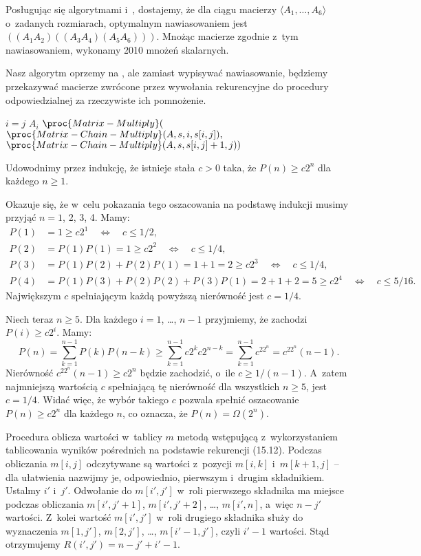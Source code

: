 
\exercise %
Posługując się algorytmami  i~, dostajemy, że dla ciągu macierzy $\langle A_1,\dots,A_6\rangle$ o~zadanych rozmiarach, optymalnym nawiasowaniem jest $((A_1A_2)((A_3A_4)(A_5A_6)))$.
Mnożąc macierze zgodnie z~tym nawiasowaniem, wykonamy 2010 mnożeń skalarnych.

\exercise %
Nasz algorytm oprzemy na , ale zamiast wypisywać nawiasowanie, będziemy przekazywać macierze zwrócone przez wywołania rekurencyjne do procedury odpowiedzialnej za rzeczywiste ich pomnożenie.
\begin{codebox}
\li	\If $i=j$
\li		\Then \Return $A_i$
		\End
\li	\Return $\proc{Matrix-Multiply}($
\zi	\>\>\> $\proc{Matrix-Chain-Multiply}(A,s,i,s[i,j]),$
\zi	\>\>\> $\proc{Matrix-Chain-Multiply}(A,s,s[i,j]+1,j))$
\end{codebox}

\exercise %
Udowodnimy przez indukcję, że istnieje stała $c>0$ taka, że $P(n)\ge c2^n$ dla każdego $n\ge1$.

Okazuje się, że w~celu pokazania tego oszacowania na podstawę indukcji musimy przyjąć $n=1$, 2, 3, 4.
Mamy:
\begin{align*}
	P(1) &= 1 \ge c2^1 \quad\Leftrightarrow\quad c \le 1/2, \\
	P(2) &= P(1)P(1) = 1 \ge c2^2 \quad\Leftrightarrow\quad c \le 1/4, \\
	P(3) &= P(1)P(2)+P(2)P(1) = 1+1 = 2 \ge c2^3 \quad\Leftrightarrow\quad c \le 1/4, \\
	P(4) &= P(1)P(3)+P(2)P(2)+P(3)P(1) = 2+1+2 = 5 \ge c2^4 \quad\Leftrightarrow\quad c \le 5/16.
\end{align*}
Największym $c$ spełniającym każdą powyższą nierówność jest $c=1/4$.

Niech teraz $n\ge5$.
Dla każdego $i=1$, \dots, $n-1$ przyjmiemy, że zachodzi $P(i)\ge c2^i$.
Mamy:
\[
	P(n) = \sum_{k=1}^{n-1}P(k)P(n-k) \ge \sum_{k=1}^{n-1}c2^kc2^{n-k} = \sum_{k=1}^{n-1}c^22^n = c^22^n(n-1).
\]
Nierówność $c^22^n(n-1)\ge c2^n$ będzie zachodzić, o~ile $c\ge1/(n-1)$.
A~zatem najmniejszą wartością $c$ spełniającą tę nierówność dla wszystkich $n\ge5$, jest $c=1/4$.
Widać więc, że wybór takiego $c$ pozwala spełnić oszacowanie $P(n)\ge c2^n$ dla każdego $n$, co oznacza, że $P(n)=\Omega(2^n)$.

\exercise %
Procedura  oblicza wartości w~tablicy $m$ metodą wstępującą z~wykorzystaniem tablicowania wyników pośrednich na podstawie rekurencji (15.12).
Podczas obliczania $m[i,j]$ odczytywane są wartości z~pozycji $m[i,k]$ i~$m[k+1,j]$ -- dla ułatwienia nazwijmy je, odpowiednio, pierwszym i~drugim składnikiem.
Ustalmy $i'$ i~$j'$.
Odwołanie do $m[i',j']$ w~roli pierwszego składnika ma miejsce podczas obliczania $m[i',j'+1]$, $m[i',j'+2]$, \dots, $m[i',n]$, a~więc $n-j'$ wartości.
Z~kolei wartość $m[i',j']$ w~roli drugiego składnika służy do wyznaczenia $m[1,j']$, $m[2,j']$, \dots, $m[i'-1,j']$, czyli $i'-1$ wartości.
Stąd otrzymujemy $R(i',j')=n-j'+i'-1$.

